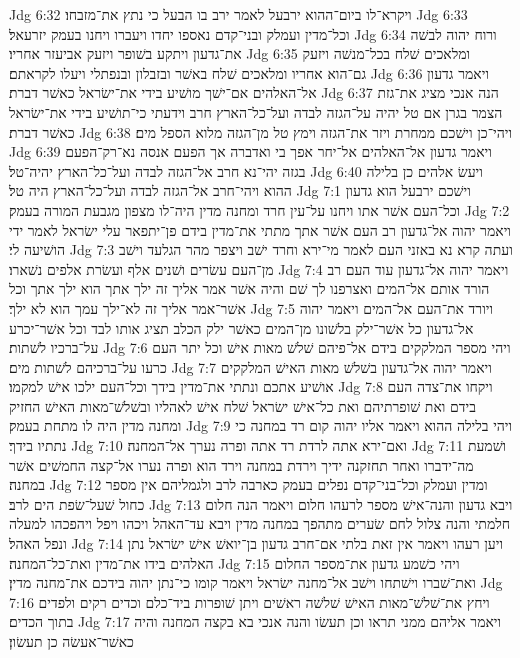 Jdg 6:32  ויקרא־לו ביום־ההוא ירבעל לאמר ירב בו הבעל כי נתץ את־מזבחו׃
Jdg 6:33  וכל־מדין ועמלק ובני־קדם נאספו יחדו ויעברו ויחנו בעמק יזרעאל׃
Jdg 6:34  ורוח יהוה לבשׁה את־גדעון ויתקע בשׁופר ויזעק אביעזר אחריו׃
Jdg 6:35  ומלאכים שׁלח בכל־מנשׁה ויזעק גם־הוא אחריו ומלאכים שׁלח באשׁר ובזבלון ובנפתלי ויעלו לקראתם׃
Jdg 6:36  ויאמר גדעון אל־האלהים אם־ישׁך מושׁיע בידי את־ישׂראל כאשׁר דברת׃
Jdg 6:37  הנה אנכי מציג את־גזת הצמר בגרן אם טל יהיה על־הגזה לבדה ועל־כל־הארץ חרב וידעתי כי־תושׁיע בידי את־ישׂראל כאשׁר דברת׃
Jdg 6:38  ויהי־כן וישׁכם ממחרת ויזר את־הגזה וימץ טל מן־הגזה מלוא הספל מים׃
Jdg 6:39  ויאמר גדעון אל־האלהים אל־יחר אפך בי ואדברה אך הפעם אנסה נא־רק־הפעם בגזה יהי־נא חרב אל־הגזה לבדה ועל־כל־הארץ יהיה־טל׃
Jdg 6:40  ויעשׂ אלהים כן בלילה ההוא ויהי־חרב אל־הגזה לבדה ועל־כל־הארץ היה טל׃
Jdg 7:1  וישׁכם ירבעל הוא גדעון וכל־העם אשׁר אתו ויחנו על־עין חרד ומחנה מדין היה־לו מצפון מגבעת המורה בעמק׃
Jdg 7:2  ויאמר יהוה אל־גדעון רב העם אשׁר אתך מתתי את־מדין בידם פן־יתפאר עלי ישׂראל לאמר ידי הושׁיעה לי׃
Jdg 7:3  ועתה קרא נא באזני העם לאמר מי־ירא וחרד ישׁב ויצפר מהר הגלעד וישׁב מן־העם עשׂרים ושׁנים אלף ועשׂרת אלפים נשׁארו׃
Jdg 7:4  ויאמר יהוה אל־גדעון עוד העם רב הורד אותם אל־המים ואצרפנו לך שׁם והיה אשׁר אמר אליך זה ילך אתך הוא ילך אתך וכל אשׁר־אמר אליך זה לא־ילך עמך הוא לא ילך׃
Jdg 7:5  ויורד את־העם אל־המים ויאמר יהוה אל־גדעון כל אשׁר־ילק בלשׁונו מן־המים כאשׁר ילק הכלב תציג אותו לבד וכל אשׁר־יכרע על־ברכיו לשׁתות׃
Jdg 7:6  ויהי מספר המלקקים בידם אל־פיהם שׁלשׁ מאות אישׁ וכל יתר העם כרעו על־ברכיהם לשׁתות מים׃
Jdg 7:7  ויאמר יהוה אל־גדעון בשׁלשׁ מאות האישׁ המלקקים אושׁיע אתכם ונתתי את־מדין בידך וכל־העם ילכו אישׁ למקמו׃
Jdg 7:8  ויקחו את־צדה העם בידם ואת שׁופרתיהם ואת כל־אישׁ ישׂראל שׁלח אישׁ לאהליו ובשׁלשׁ־מאות האישׁ החזיק ומחנה מדין היה לו מתחת בעמק׃
Jdg 7:9  ויהי בלילה ההוא ויאמר אליו יהוה קום רד במחנה כי נתתיו בידך׃
Jdg 7:10  ואם־ירא אתה לרדת רד אתה ופרה נערך אל־המחנה׃
Jdg 7:11  ושׁמעת מה־ידברו ואחר תחזקנה ידיך וירדת במחנה וירד הוא ופרה נערו אל־קצה החמשׁים אשׁר במחנה׃
Jdg 7:12  ומדין ועמלק וכל־בני־קדם נפלים בעמק כארבה לרב ולגמליהם אין מספר כחול שׁעל־שׂפת הים לרב׃
Jdg 7:13  ויבא גדעון והנה־אישׁ מספר לרעהו חלום ויאמר הנה חלום חלמתי והנה צלול לחם שׂערים מתהפך במחנה מדין ויבא עד־האהל ויכהו ויפל ויהפכהו למעלה ונפל האהל׃
Jdg 7:14  ויען רעהו ויאמר אין זאת בלתי אם־חרב גדעון בן־יואשׁ אישׁ ישׂראל נתן האלהים בידו את־מדין ואת־כל־המחנה׃
Jdg 7:15  ויהי כשׁמע גדעון את־מספר החלום ואת־שׁברו וישׁתחו וישׁב אל־מחנה ישׂראל ויאמר קומו כי־נתן יהוה בידכם את־מחנה מדין׃
Jdg 7:16  ויחץ את־שׁלשׁ־מאות האישׁ שׁלשׁה ראשׁים ויתן שׁופרות ביד־כלם וכדים רקים ולפדים בתוך הכדים׃
Jdg 7:17  ויאמר אליהם ממני תראו וכן תעשׂו והנה אנכי בא בקצה המחנה והיה כאשׁר־אעשׂה כן תעשׂון׃
